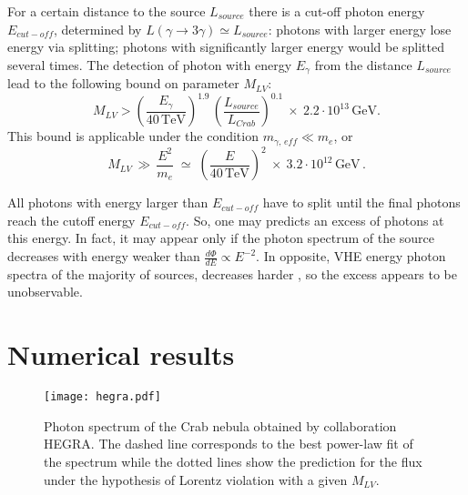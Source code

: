 \documentclass{webofc}
\def\l{\left(}
\def\r{\right)}
\newcommand{\be}{\begin{equation}}
\newcommand{\ee}{\end{equation}}
\begin{document}
For a certain distance to the source $L_{source}$  there is a cut-off photon energy $E_{cut-off}$, determined by $L  \l\gamma \to 3\gamma\r \simeq L_{source}$: photons with larger energy lose energy via splitting; photons with significantly larger energy would be splitted several times. The detection of photon with energy $E_\gamma$ from the distance $L_{source}$ lead to the following bound on parameter $M_{LV}$:
\be
\label{Splitting General Bound}
M_{LV} > \l \frac{E_\gamma}{40\,\mbox{TeV}}\r^{1.9} \, \l \frac{L_{source}}{L_{Crab}}\r^{0.1} \ \times \ 2.2 \cdot 10^{13} \,\mbox{GeV}.
\ee
This bound is applicable under the condition $m_{\gamma, \, eff} \ll m_e$, or
\begin{equation}
\label{condition}
M_{LV} \, \gg \, \frac{E^2}{m_e} \; \simeq \; \left( \frac{E}{40\,\mbox{TeV}}\right)^2 \ \times \  3.2\cdot 10^{12}\,\mbox{GeV}\,.
\end{equation}

All photons with energy larger than $E_{cut-off}$ have to split until the final photons reach the cutoff energy $E_{cut-off}$. So, one may predicts an excess of photons at this energy. In fact, it may appear only if the photon spectrum of the source decreases with energy weaker than $\frac{d\Phi}{dE} \propto E^{-2}$. In opposite, VHE energy photon spectra of the majority of sources, decreases harder \cite{Aharonian:2004gb}, so the excess appears to be unobservable.

\section{Numerical results}
\label{Numerical results}

\begin{figure}[h]
\centering
\texttt{[image: hegra.pdf]}
\caption{\label{Fig1} Photon spectrum of the Crab nebula obtained by collaboration HEGRA\cite{Aharonian:2004gb}.  The dashed line corresponds to the best power-law fit of the spectrum while the dotted lines show the prediction for the flux under the hypothesis of Lorentz violation with a given $M_{LV}$. }
\end{figure}
\end{document}
